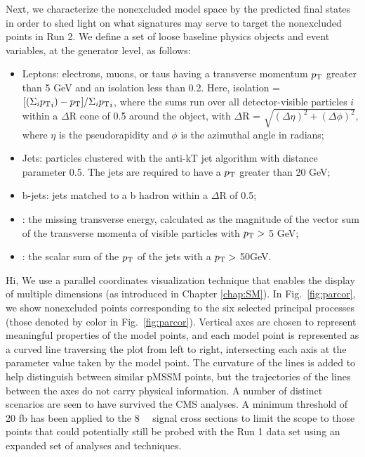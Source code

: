 Next, we characterize the nonexcluded model space by the predicted
final states in order to shed light on what signatures may serve to target the nonexcluded points in Run 2.  We define a set of loose baseline physics objects and event 
variables, at the generator level, as follows:
\begin{itemize}
\item Leptons: electrons, muons, or taus having a transverse momentum $p_{\rm T}$ greater than 5 GeV and an isolation less than 0.2. Here, isolation  =
$[(\Sigma_{i}{p_{\rm T}}_i) - p_{\rm T}]/\Sigma_{i}{p_{\rm T}}_i$,
where the sums run over all detector-visible particles $i$ within a
$\Delta$R cone of 0.5 around the object, with $\Delta$R = $\sqrt{(\Delta\eta)^2+(\Delta\phi)^2}$, where $\eta$ is the pseudorapidity and $\phi$ is the azimuthal angle in radians;
\item Jets: particles clustered with the anti-kT jet algorithm \cite{Cacciari:2008gp} with distance parameter 0.5. The jets are required to have a $p_{\rm T}$ greater than 20 GeV;
\item b-jets: jets matched to a b hadron within a $\Delta$R of 0.5;
\item \MET{}: the missing transverse energy, calculated as the magnitude
  of the vector sum of the transverse momenta of
 visible particles with $p_{\rm T} >$ 5 GeV; 
\item \HT{}: the scalar sum of the $p_{\rm T}$ of the jets with
  a $p_{\rm T}>$ 50GeV.
\end{itemize}

Hi, We use a parallel coordinates visualization technique that enables the
display of multiple dimensions (as introduced in Chapter \ref{chap:SM}). In Fig.~\ref{fig:parcor},
we show nonexcluded points corresponding to the six selected
principal processes (those denoted by color in Fig.~\ref{fig:parcor}).
Vertical axes are chosen to represent meaningful properties of the model
points, and each model point is represented as a curved line traversing the plot from left to right, intersecting each axis at the parameter value taken by the model point. The curvature of the lines is added to help distinguish between similar pMSSM points, but the trajectories of the lines between the axes do not carry physical information. A number of distinct scenarios are seen to have survived the CMS
analyses.  A minimum threshold of 20 fb has been applied to the 8~\TeV~ signal
cross sections to limit the scope to those
points that could potentially still be probed with the Run 1 data set
using an expanded set of analyses and techniques.


